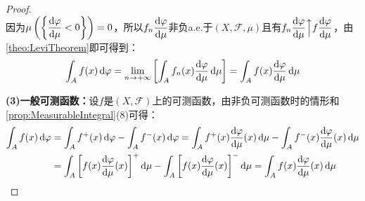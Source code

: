 \begin{proof}
\begin{equation*}
	\end{equation*}
	因为$\mu\left(\left\{\dfrac{\mathop{}\!\mathrm{d}\varphi}{\mathop{}\!\mathrm{d}\mu}<0\right\}\right)=0$，所以$f_n\dfrac{\mathop{}\!\mathrm{d}\varphi}{\mathop{}\!\mathrm{d}\mu}$非负a.e.于$(X,\mathscr{F},\mu)$且有$f_n\dfrac{\mathop{}\!\mathrm{d}\varphi}{\mathop{}\!\mathrm{d}\mu}\Big\uparrow f\dfrac{\mathop{}\!\mathrm{d}\varphi}{\mathop{}\!\mathrm{d}\mu}$，由\cref{theo:LeviTheorem}即可得到：
	\begin{equation*}
		\int_{A}f(x)\mathop{}\!\mathrm{d}\varphi=\lim_{n\to+\infty}\left[\int_{A}f_n(x)\frac{\mathop{}\!\mathrm{d}\varphi}{\mathop{}\!\mathrm{d}\mu}\mathop{}\!\mathrm{d}\mu\right]=\int_{A}f(x)\frac{\mathop{}\!\mathrm{d}\varphi}{\mathop{}\!\mathrm{d}\mu}\mathop{}\!\mathrm{d}\mu
	\end{equation*}\par
	\textbf{(3)一般可测函数：}设$f$是$(X,\mathscr{F})$上的可测函数，由非负可测函数时的情形和\cref{prop:MeasurableIntegral}(8)可得：
	\begin{align*}
		\int_{A}f(x)\dif\varphi&=\int_{A}f^+(x)\dif\varphi-\int_{A}f^-(x)\dif\varphi=\int_{A}f^+(x)\frac{\dif\varphi}{\dif\mu}(x)\dif\mu-\int_{A}f^-(x)\frac{\dif\varphi}{\dif\mu}(x)\dif\mu \\
		&=\int_{A}\left[f(x)\frac{\dif\varphi}{\dif\mu}(x)\right]^+\dif\mu-\int_{A}\left[f(x)\frac{\dif\varphi}{\dif\mu}(x)\right]^-\dif\mu=\int_{A}f(x)\frac{\dif\varphi}{\dif\mu}(x)\dif\mu\qedhere
	\end{align*}
\end{proof}
